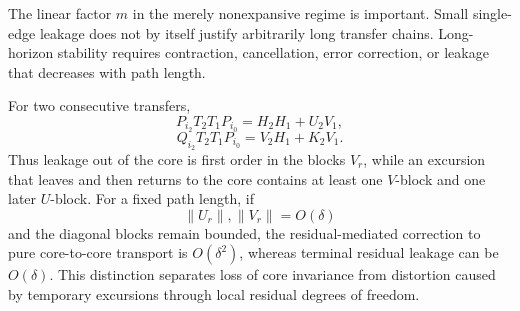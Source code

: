 The linear factor \(m\) in the merely nonexpansive regime is important. Small
single-edge leakage does not by itself justify arbitrarily long transfer
chains. Long-horizon stability requires contraction, cancellation, error
correction, or leakage that decreases with path length.


For two consecutive transfers,
\[
P_{i_2}T_2T_1P_{i_0}
=
H_2H_1+U_2V_1,
\]
\[
Q_{i_2}T_2T_1P_{i_0}
=
V_2H_1+K_2V_1.
\]
Thus leakage out of the core is first order in the blocks \(V_r\), while an
excursion that leaves and then returns to the core contains at least one
\(V\)-block and one later \(U\)-block. For a fixed path length, if
\[
\|U_r\|,\|V_r\|=O(\delta)
\]
and the diagonal blocks remain bounded, the residual-mediated correction to
pure core-to-core transport is \(O(\delta^2)\), whereas terminal residual
leakage can be \(O(\delta)\). This distinction separates loss of core
invariance from distortion caused by temporary excursions through local
residual degrees of freedom.
